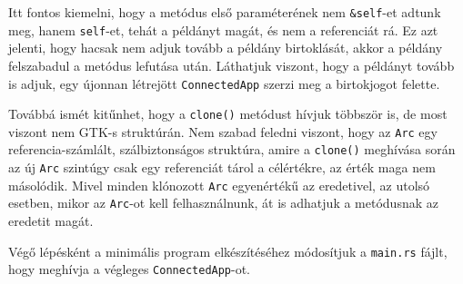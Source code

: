 

Itt fontos kiemelni, hogy a metódus első paraméterének nem \texttt{\&self}-et adtunk meg,
hanem \texttt{self}-et, tehát a példányt magát, és nem a referenciát rá.
Ez azt jelenti, hogy hacsak nem adjuk tovább a példány birtoklását, akkor a példány felszabadul
a metódus lefutása után.
Láthatjuk viszont, hogy a példányt tovább is adjuk, egy újonnan létrejött \texttt{ConnectedApp}
szerzi meg a birtokjogot felette.

Továbbá ismét kitűnhet, hogy a \texttt{clone()} metódust hívjuk többször is,
de most viszont nem GTK-s struktúrán.
Nem szabad feledni viszont, hogy az \texttt{Arc} egy referencia-számlált, szálbiztonságos struktúra, 
amire a \texttt{clone()} meghívása során az új \texttt{Arc} szintúgy csak egy referenciát tárol
a célértékre, az érték maga nem másolódik.
Mivel minden klónozott \texttt{Arc} egyenértékű az eredetivel, az utolsó esetben, mikor az \texttt{Arc}-ot
kell felhasználnunk, át is adhatjuk a metódusnak az eredetit magát.

Végő lépésként a minimális program elkészítéséhez módosítjuk a \texttt{main.rs} fájlt,
hogy meghívja a végleges \texttt{ConnectedApp}-ot.

